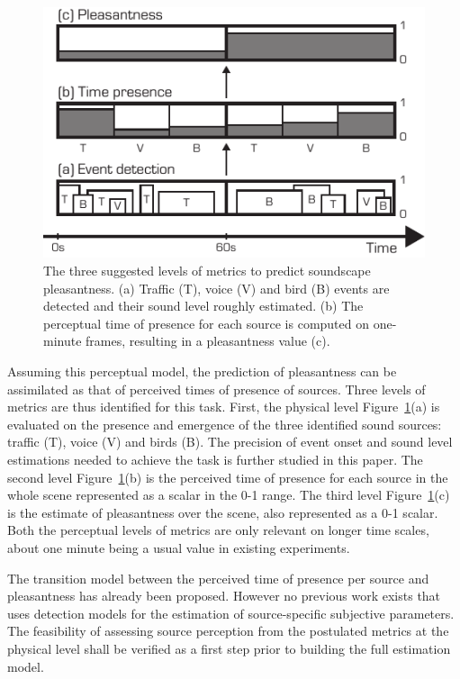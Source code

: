 \documentclass{article}
\begin{document}
\begin{sloppy}

\begin{figure}[t]
  \centering
  \centerline{\includegraphics[width=0.8\columnwidth]{block.pdf}}
  \caption{The three suggested levels of metrics to predict soundscape pleasantness. (a) Traffic (T), voice (V) and bird (B) events are detected and their sound level roughly estimated. (b) The perceptual time of presence for each source is computed on one-minute frames, resulting in a pleasantness value (c).}
  \label{fig:block}
\end{figure}

Assuming this perceptual model, the prediction of pleasantness can be assimilated as that of perceived times of presence of sources. Three levels of metrics are thus identified for this task. First, the physical level Figure~\ref{fig:block}(a) is evaluated on the presence and emergence of the three identified sound sources: traffic (T), voice (V) and birds (B). The precision of event onset and sound level estimations needed to achieve the task is further studied in this paper. The second level Figure~\ref{fig:block}(b) is the perceived time of presence for each source in the whole scene represented as a scalar in the 0-1 range. The third level Figure~\ref{fig:block}(c) is the estimate of pleasantness over the scene, also represented as a 0-1 scalar. Both the perceptual levels of metrics are only relevant on longer time scales, about one minute being a usual value in existing experiments.

The transition model between the perceived time of presence per source and pleasantness has already been proposed. However no previous work exists that uses detection models for the estimation of source-specific subjective parameters. The feasibility of assessing source perception from the postulated metrics at the physical level shall be verified as a first step prior to building the full estimation model.


\end{sloppy}
\end{document}
